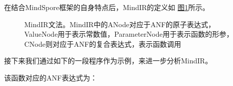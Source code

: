 \documentclass[letterpaper,10pt,english]{sphinxmanual}
\let\sphinxpxdimen\pdfpxdimen\else\newdimen\sphinxpxdimen
\begin{document}
\sphinxAtStartPar
在结合MindSpore框架的自身特点后，MindIR的定义如
\hyperref[\detokenize{chapter_frontend_and_ir/intermediate_representation:mindir}]{图\ref{\detokenize{chapter_frontend_and_ir/intermediate_representation:mindir}}}所示。

\begin{figure}[H]
\centering
\capstart

\noindent\sphinxincludegraphics[width=1100\sphinxpxdimen]{{中间表示-MindIR}.png}
\caption{MindIR文法。MindIR中的ANode对应于ANF的原子表达式，ValueNode用于表示常数值，ParameterNode用于表示函数的形参，CNode则对应于ANF的复合表达式，表示函数调用}\label{\detokenize{chapter_frontend_and_ir/intermediate_representation:id18}}\label{\detokenize{chapter_frontend_and_ir/intermediate_representation:mindir}}\end{figure}

\sphinxAtStartPar
接下来我们通过如下的一段程序作为示例，来进一步分析MindIR。

\begin{sphinxVerbatim}[commandchars=\\\{\}]
  
       

  
        
        
         
     
\end{sphinxVerbatim}

\sphinxAtStartPar
该函数对应的ANF表达式为：

\begin{sphinxVerbatim}[commandchars=\\\{\}]
  
          
          
         
              
          
         
          
     
\end{sphinxVerbatim}
\end{document}
